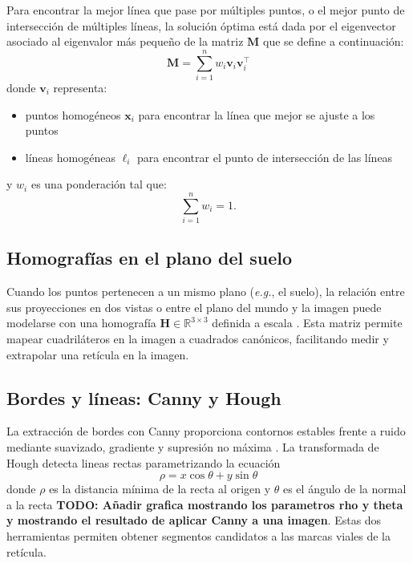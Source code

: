 Para encontrar la mejor línea que pase por múltiples puntos, o el mejor punto de intersección de múltiples líneas, la solución óptima está dada por el eigenvector asociado al eigenvalor más pequeño de la matriz $\mathbf{M}$ \cite{kanatani1998statistical} que se define a continuación:
\begin{equation}
	\mathbf{M} = \sum_{i=1}^{n} w_i \mathbf{v}_i \mathbf{v}_i^\top
\end{equation}
donde $\mathbf{v}_i$ representa:
\begin{itemize}
	\item puntos homogéneos $\mathbf{x}_i$ para encontrar la línea que mejor se ajuste a los puntos
	\item líneas homogéneas $\ell_i$ para encontrar el punto de intersección de las líneas
\end{itemize} y  $w_i$ es una ponderación tal que:
\[
\sum_{i=1}^{n} w_i = 1.
\]

\subsection{Homografías en el plano del suelo}\label{subsec:homografias}

Cuando los puntos pertenecen a un mismo plano (\emph{e.g.}, el suelo),
la relación entre sus proyecciones en  dos vistas o entre el plano del
mundo   y    la   imagen   puede   modelarse    con   una   homografía
\(\mathbf{H}\in\mathbb{R}^{3\times3}\)      definida     a      escala
\cite{hartley2003multiple}. Esta  matriz permite  mapear cuadriláteros
en la imagen a cuadrados canónicos, facilitando medir y extrapolar una
retícula en la imagen.

\subsection{Bordes y líneas: Canny y Hough}\label{sec:canny-hough}

La extracción de bordes con Canny proporciona contornos estables frente a ruido mediante suavizado, gradiente y supresión no máxima \cite{canny1986edge}. La transformada de Hough detecta lineas rectas parametrizando la ecuación\[\rho=x\cos{\theta}+y\sin{\theta}\] donde $\rho$ es la distancia mínima de la recta al origen y $\theta$ es el ángulo de la normal a la recta\cite{DudaEtAl1972} {\bfseries TODO: Añadir grafica mostrando los parametros rho y theta y mostrando el resultado de aplicar Canny a una imagen}. Estas dos herramientas permiten obtener segmentos candidatos a las marcas viales de la retícula.


